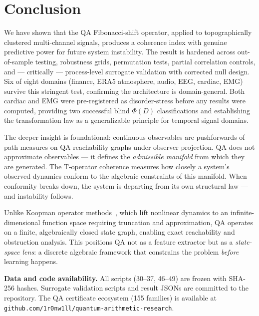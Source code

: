 \documentclass[11pt,a4paper]{article}
\begin{document}
\section{Conclusion}

We have shown that the QA Fibonacci-shift operator, applied to topographically
clustered multi-channel signals, produces a coherence index with genuine
predictive power for future system instability. The result is hardened
across out-of-sample testing, robustness grids, permutation tests,
partial correlation controls, and --- critically --- process-level
surrogate validation with corrected null design. Six of eight domains
(finance, ERA5 atmosphere, audio, EEG, cardiac, EMG) survive this
stringent test, confirming the architecture is domain-general. Both
cardiac and EMG were pre-registered as disorder-stress before any
results were computed, providing two successful blind $\Phi(D)$
classifications and establishing the transformation law as a
generalizable principle for temporal signal domains.

The deeper insight is foundational: continuous observables are pushforwards
of path measures on QA reachability graphs under observer projection.
QA does not approximate observables --- it defines the \emph{admissible
manifold} from which they are generated. The T-operator coherence measures
how closely a system's observed dynamics conform to the algebraic constraints
of this manifold. When conformity breaks down, the system is departing from
its own structural law --- and instability follows.

Unlike Koopman operator methods~\cite{koopman1931}, which lift nonlinear
dynamics to an infinite-dimensional function space requiring truncation
and approximation,
QA operates on a finite, algebraically closed state graph, enabling exact
reachability and obstruction analysis. This positions QA not as a feature
extractor but as a \emph{state-space lens}: a discrete algebraic framework
that constrains the problem \emph{before} learning happens.

\bigskip
\noindent\textbf{Data and code availability.}
All scripts (30--37, 46--49) are frozen with SHA-256 hashes.
Surrogate validation scripts and result JSONs are committed to the
repository. The QA certificate ecosystem (155 families) is available at
\texttt{github.com/1r0nw1ll/quantum-arithmetic-research}.
\end{document}
